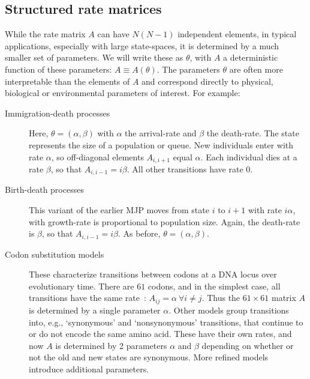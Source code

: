 \subsection{Structured rate matrices}
While the rate matrix $A$ can have $N(N-1)$ independent elements, in typical applications, especially with large state-spaces, it is determined by a much smaller set of parameters. 
We will write these as $\theta$, with $A$ a deterministic function of these parameters: $A \equiv A(\theta)$. 
The parameters $\theta$ are often more interpretable than the elements of $A$ and correspond directly to physical, biological or environmental parameters of interest. 
For example:
\begin{description}
  \item[Immigration-death processes] 
    Here, $\theta = (\alpha,\beta)$ with $\alpha$ the arrival-rate and $\beta$ the death-rate. 
    The state represents the size of a population or queue. 
    New individuals enter with rate $\alpha$, so off-diagonal elements $A_{i,i+1}$ equal $\alpha$.
    Each individual dies at a rate $\beta$, so that $A_{i,i-1}=i\beta$.
    All other transitions have rate $0$. 
  \item[Birth-death processes] 
    This variant of the earlier MJP moves from state $i$ to $i+1$ with rate $i\alpha$, with growth-rate is proportional to population size. 
    Again, the death-rate is $\beta$, so that $A_{i,i-1}=i\beta$.
    As before, $\theta=(\alpha,\beta)$.
  \item[Codon substitution models] 
    These characterize transitions between codons at a DNA locus over evolutionary time. 
    There are $61$ codons, and in the simplest case, all transitions have the same rate~\citep{jukescantor69}: $A_{ij} = \alpha\ \forall i \neq j$. 
    Thus the $61\times 61$ matrix $A$ is determined by a single parameter $\alpha$. Other models group transitions into, e.g., `synonymous' and `nonsynonymous' transitions, that continue to or do not encode the same amino acid. 
    These have their own rates, and now $A$ is determined by 2 parameters $\alpha$ and $\beta$ depending on whether or not the old and new states are synonymous. 
    More refined models~\citep{goldman1994codon} introduce additional parameters. 
\end{description}
